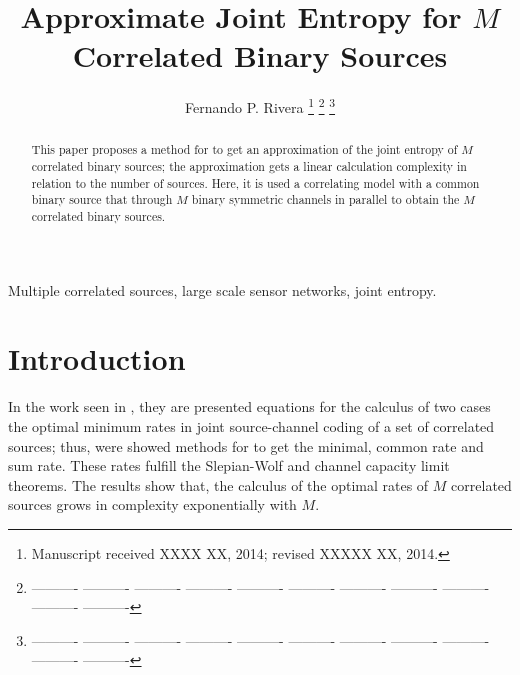 \documentclass[journal]{IEEEtran}
\begin{document}
\title{Approximate Joint Entropy for $M$ Correlated Binary Sources }


\author{Fernando P. Rivera 
\thanks{Manuscript received XXXX XX, 2014; revised XXXXX XX, 2014.}
\thanks{---------- ---------- ---------- ---------- ---------- ---------- ---------- ---------- ---------- ---------- ---------- }%
\thanks{---------- ---------- ---------- ---------- ---------- ---------- ---------- ---------- ---------- ---------- ---------- }}%


\maketitle


\begin{abstract}
This paper proposes a method for to get an approximation of the joint entropy
of $M$ correlated binary sources; the approximation gets a linear calculation complexity 
in relation to the number of sources. 
Here, it is used a correlating model with a common
binary source that through $M$ binary symmetric channels in parallel
to obtain  the $M$ correlated binary sources. 

\end{abstract}

\begin{keywords}
Multiple correlated sources, large scale sensor networks, joint entropy.
\end{keywords}

\IEEEpeerreviewmaketitle
\section{Introduction}
\label{sec:Intro}

 In the work seen in \cite{fernando}, they are presented equations for the calculus of two cases the 
 optimal minimum rates in joint source-channel coding of a set of correlated sources;
 thus, were showed methods for to get the minimal,  common rate and  sum rate.
 These  rates fulfill the Slepian-Wolf 
 \cite{slepian} and channel capacity limit \cite{cover} theorems.
 The results show that, the calculus of 
 the optimal rates of $M$ correlated sources grows in complexity exponentially 
 with $M$.  
 
\end{document}
